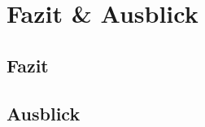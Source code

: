 \cleardoublepage
\chapter{Fazit \& Ausblick}
\label{ch:FazitAusblick}

\section{Fazit}
\label{sec:Fazit }

\section{Ausblick}
\label{sec:Ausblick}



